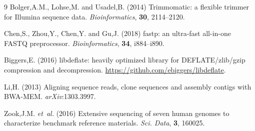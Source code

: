 \begin{thebibliography}{9}
\small
{}
Bolger,A.M., Lohse,M. and Usadel,B. (2014) Trimmomatic: a flexible trimmer for
Illumina sequence data. \textit{Bioinformatics}, \textbf{30}, 2114--2120.

Chen,S., Zhou,Y., Chen,Y. and Gu,J. (2018) fastp: an ultra-fast all-in-one
FASTQ preprocessor. \textit{Bioinformatics}, \textbf{34}, i884--i890.

Biggers,E. (2016) libdeflate: heavily optimized library for DEFLATE/zlib/gzip
compression and decompression. \url{https://github.com/ebiggers/libdeflate}.

Li,H. (2013) Aligning sequence reads, clone sequences and assembly contigs with
BWA-MEM. \textit{arXiv}:1303.3997.

Zook,J.M. \textit{et~al.} (2016) Extensive sequencing of seven human genomes to
characterize benchmark reference materials. \textit{Sci. Data}, \textbf{3},
160025.
\end{thebibliography}


